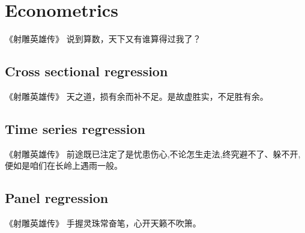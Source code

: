 \chapter{Econometrics }
\label{chap: econometrics}
\begin{chapquote}{\kaishu 《射雕英雄传》}
说到算数，天下又有谁算得过我了？
\end{chapquote}

\section{Cross sectional regression}
\begin{chapquote}{\kaishu 《射雕英雄传》}
天之道，损有余而补不足。是故虚胜实，不足胜有余。
\end{chapquote}

\section{Time series regression}
\begin{chapquote}{\kaishu 《射雕英雄传》}
前途既已注定了是忧患伤心,不论怎生走法,终究避不了、躲不开,便如是咱们在长岭上遇雨一般。
\end{chapquote}

\section{Panel regression}
\begin{chapquote}{\kaishu 《射雕英雄传》}
手握灵珠常奋笔，心开天籁不吹箫。
\end{chapquote}
